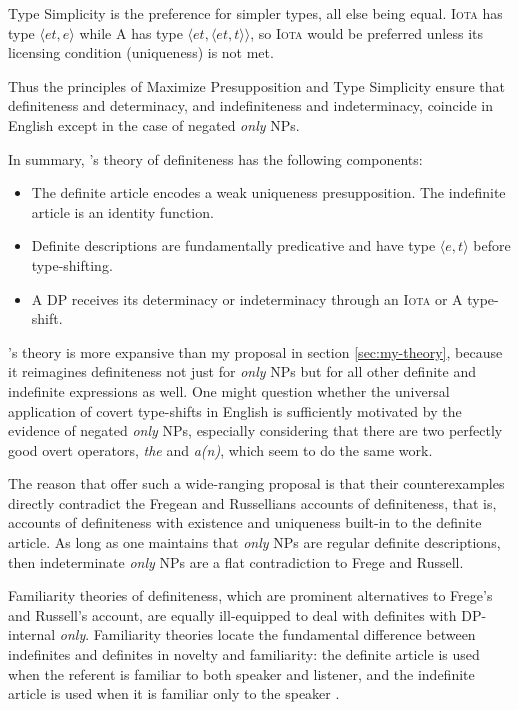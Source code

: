 Type Simplicity is the preference for simpler types, all else being equal. \textsc{Iota} has type $\langle et, e \rangle$ while \textsc{A} has type $\langle et, \langle et, t \rangle \rangle$, so \textsc{Iota} would be preferred unless its licensing condition (uniqueness) is not met.

Thus the principles of Maximize Presupposition and Type Simplicity ensure that definiteness and determinacy, and indefiniteness and indeterminacy, coincide in English except in the case of negated \textit{only} NPs.

In summary, \citeauthor{cb2015}'s theory of definiteness has the following components:

\begin{itemize}
	\item The definite article encodes a weak uniqueness presupposition. The indefinite article is an identity function.
	\item Definite descriptions are fundamentally predicative and have type $\langle e, t \rangle$ before type-shifting.
	\item A DP receives its determinacy or indeterminacy through an \textsc{Iota} or \textsc{A} type-shift.
\end{itemize}

\citeauthor{cb2015}'s theory is more expansive than my proposal in section \ref{sec:my-theory}, because it reimagines definiteness not just for \textit{only} NPs but for all other definite and indefinite expressions as well. One might question whether the universal application of covert type-shifts in English is sufficiently motivated by the evidence of negated \textit{only} NPs, especially considering that there are two perfectly good overt operators, \textit{the} and \textit{a(n)}, which seem to do the same work.

The reason that \citeauthor{cb2015} offer such a wide-ranging proposal is that their counterexamples directly contradict the Fregean and Russellians accounts of definiteness, that is, accounts of definiteness with existence and uniqueness built-in to the definite article. As long as one maintains that \textit{only} NPs are regular definite descriptions, then indeterminate \textit{only} NPs are a flat contradiction to Frege and Russell.

Familiarity theories of definiteness, which are prominent alternatives to Frege's and Russell's account, are equally ill-equipped to deal with definites with DP-internal \textit{only}. Familiarity theories locate the fundamental difference between indefinites and definites in novelty and familiarity: the definite article is used when the referent is familiar to both speaker and listener, and the indefinite article is used when it is familiar only to the speaker \citep{heim82}.

